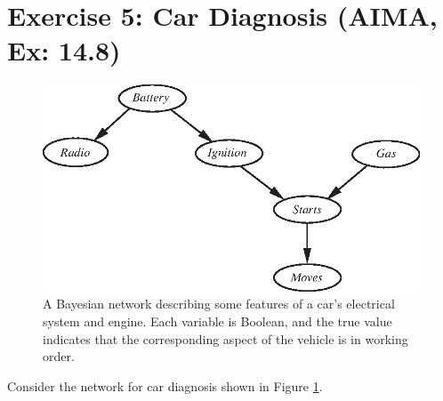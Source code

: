 \documentclass[9pt,a4paper]{extarticle}
\begin{document}
\section*{Exercise 5: Car Diagnosis (AIMA, Ex: 14.8)}
\begin{figure}[h]
    \centering
    \includegraphics[width=.6\textwidth]{figures/car-starts.eps}
    \caption{A Bayesian network describing some features of a car’s electrical system and engine. Each variable is Boolean, and the true value indicates that the corresponding aspect of the vehicle is in working order.}
    \label{fig:car_bnet}
\end{figure}
Consider the network for car diagnosis shown in Figure \ref{fig:car_bnet}.
\end{document}
